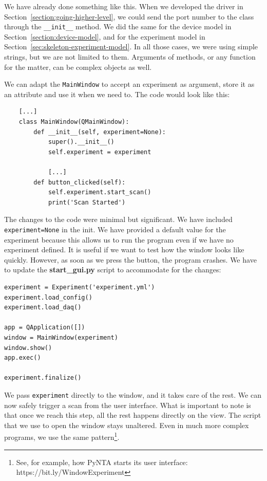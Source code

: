 We have already done something like this. When we developed the driver in Section~\ref{section:going-higher-level}, we could send the port number to the class through the \texttt{\_\_init\_\_} method. We did the same for the device model in Section~\ref{section:device-model}, and for the experiment model in Section~\ref{sec:skeleton-experiment-model}. In all those cases, we were using simple strings, but we are not limited to them. Arguments of methods, or any function for the matter, can be complex objects as well.

We can adapt the \texttt{MainWindow} to accept an experiment as argument, store it as an attribute and use it when we need to. The code would look like this:

\begin{verbatim}
    [...]
    class MainWindow(QMainWindow):
        def __init__(self, experiment=None):
            super().__init__()
            self.experiment = experiment

            [...]
        def button_clicked(self):
            self.experiment.start_scan()
            print('Scan Started')
\end{verbatim}

The changes to the code were minimal but significant. We have included \texttt{experiment=None} in the init. We have provided a default value for the experiment because this allows us to run the program even if we have no experiment defined. It is useful if we want to test how the window looks like quickly. However, as soon as we press the button, the program crashes. We have to update the \textbf{start\_gui.py} script to accommodate for the changes:

\begin{verbatim}
experiment = Experiment('experiment.yml')
experiment.load_config()
experiment.load_daq()

app = QApplication([])
window = MainWindow(experiment)
window.show()
app.exec()

experiment.finalize()
\end{verbatim}

We pass \texttt{experiment} directly to the window, and it takes care of the rest. We can now safely trigger a scan from the user interface. What is important to note is that once we reach this step, all the rest happens directly on the view. The script that we use to open the window stays unaltered. Even in much more complex programs, we use the same pattern\footnote{See, for example, how PyNTA starts its user interface: https://bit.ly/WindowExperiment}.

